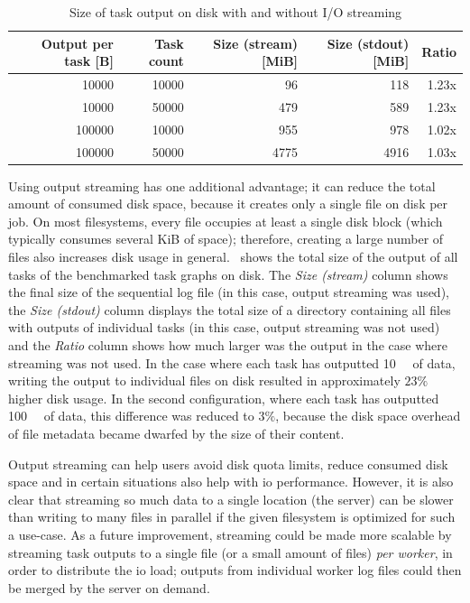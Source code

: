 \begin{table}[h]
	\centering
	\begin{tabular}{|r|r|r|r|r|}
		\hline
		Output per task [B] & Task count & Size (stream) [MiB] & Size (stdout) [MiB] & Ratio \\ \hline
		10000               & 10000      & 96                  & 118                 & 1.23x \\ \hline
		10000               & 50000      & 479                 & 589                 & 1.23x \\ \hline
		100000              & 10000      & 955                 & 978                 & 1.02x \\ \hline
		100000              & 50000      & 4775                & 4916                & 1.03x \\ \hline
	\end{tabular}
	\caption{Size of task output on disk with and without I/O streaming}
	\label{tab:hq-io-streaming-size}
\end{table}

Using output streaming has one additional advantage; it can reduce the total amount of consumed
disk space, because it creates only a single file on disk per job. On most filesystems, every file
occupies at least a single disk block (which typically consumes several KiB of space); therefore,
creating a large number of files also increases disk usage in general.~
shows the total size of the output of all tasks of the benchmarked task graphs on disk. The
\emph{Size (stream)} column shows the final size of the sequential log file (in this case,
output streaming was used), the \emph{Size (stdout)} column displays the total size of a
directory containing all files with outputs of individual tasks (in this case, output streaming was
not used) and the \emph{Ratio} column shows how much larger was the output in the case
where streaming was not used. In the case where each task has outputted \SI{10}{\kibi\byte} of
data, writing the output to individual files on disk resulted in approximately
$23\%$ higher disk usage. In the second configuration, where each task has
outputted \SI{100}{\kibi\byte} of data, this difference was reduced to $3\%$,
because the disk space overhead of file metadata became dwarfed by the size of their content.

Output streaming can help users avoid disk quota limits, reduce consumed disk space and in certain
situations also help with \gls{io} performance. However, it is also clear that
streaming so much data to a single location (the server) can be slower than writing to many files
in parallel if the given filesystem is optimized for such a use-case. As a future improvement,
streaming could be made more scalable by streaming task outputs to a single file (or a small amount
of files) \emph{per worker}, in order to distribute the \gls{io} load; outputs
from individual worker log files could then be merged by the server on demand.

